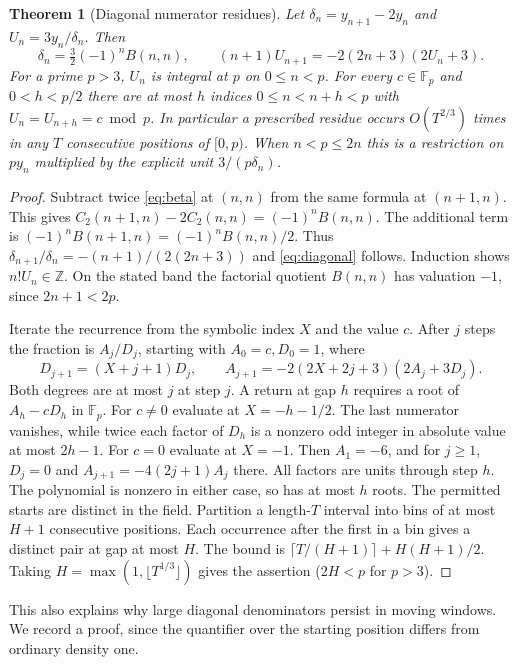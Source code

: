 \documentclass[11pt]{article}
\newtheorem{theorem}{Theorem}[section]
\newcommand{\F}{\mathbb F}
\newcommand{\Z}{\mathbb Z}
\begin{document}
\begin{theorem}[Diagonal numerator residues]\label{th:diagonal}
Let $\delta_n=y_{n+1}-2y_n$ and $U_n=3y_n/\delta_n$. Then
\begin{equation}
 \delta_n=\tfrac32(-1)^nB(n,n),\qquad
 (n+1)U_{n+1}=-2(2n+3)(2U_n+3).
 \label{eq:diagonal}
\end{equation}
For a prime $p>3$, $U_n$ is integral at $p$ on $0\le n<p$. For every
$c\in\F_p$ and $0<h<p/2$ there are at most $h$ indices
$0\le n<n+h<p$ with $U_n=U_{n+h}=c\bmod p$. In particular a prescribed
residue occurs $O(T^{2/3})$ times in any $T$ consecutive positions of
$[0,p)$. When $n<p\le2n$ this is a restriction on $p y_n$ multiplied by
the explicit unit $3/(p\delta_n)$.
\end{theorem}
\begin{proof}
Subtract twice \eqref{eq:beta} at $(n,n)$ from the same formula
at $(n+1,n)$. This gives $C_2(n+1,n)-2C_2(n,n)=(-1)^nB(n,n)$.
The additional term is $(-1)^n B(n+1,n)=(-1)^n B(n,n)/2$.
Thus $\delta_{n+1}/\delta_n=-(n+1)/(2(2n+3))$ and \eqref{eq:diagonal} follows.
Induction shows $n!U_n\in\Z$. On the stated band the factorial quotient
$B(n,n)$ has valuation $-1$, since $2n+1<2p$.

Iterate the recurrence from the symbolic index $X$ and the value $c$.
After $j$ steps the fraction is $A_j/D_j$, starting with $A_0=c,D_0=1$, where
\[
 D_{j+1}=(X+j+1)D_j,\qquad
 A_{j+1}=-2(2X+2j+3)(2A_j+3D_j).
\]
Both degrees are at most $j$ at step $j$. A return at gap $h$ requires a
root of $A_h-cD_h$ in $\F_p$. For $c\ne0$ evaluate at $X=-h-1/2$.
The last numerator vanishes, while twice each factor of $D_h$ is a
nonzero odd integer in absolute value at most $2h-1$. For $c=0$ evaluate
at $X=-1$. Then $A_1=-6$, and for $j\ge1$, $D_j=0$ and
$A_{j+1}=-4(2j+1)A_j$ there. All factors are units through step $h$.
The polynomial is nonzero in either case, so has at most $h$ roots.
The permitted starts are distinct in the field. Partition a length-$T$
interval into bins of at most $H+1$ consecutive positions. Each occurrence
after the first in a bin gives a distinct pair at gap at most $H$.
The bound is $\lceil T/(H+1)\rceil+H(H+1)/2$. Taking
$H=\max(1,\lfloor T^{1/3}\rfloor)$ gives the assertion ($2H<p$ for $p>3$).
\end{proof}

This also explains why large diagonal denominators persist in moving
windows. We record a proof, since the quantifier over the starting position
differs from ordinary density one.
\end{document}
